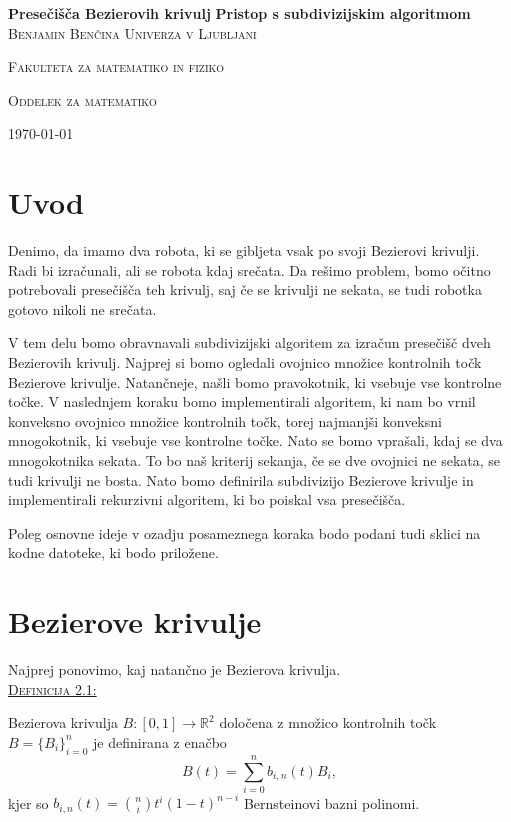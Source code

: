 \documentclass[a4paper, 12pt]{article} %
\newenvironment{matematika}[1]{
{\underline{\textsc{#1:}}}
}{
}
\begin{document}
\begin{titlepage}
\centering
\textbf{\Huge{Presečišča Bezierovih krivulj}}
\vfill
\textbf{\LARGE{Pristop s subdivizijskim algoritmom}}
\vfill\vfill
\textsc{\Large{Benjamin Benčina}}
\vfill\vfill
\textsc{\large{Univerza v Ljubljani}}

\textsc{\large{Fakulteta za matematiko in fiziko}}

\textsc{\large{Oddelek za matematiko}}
\vfill\vfill\vfill
	
{\large\today}

\end{titlepage}

\tableofcontents
\newpage

\section{Uvod}

Denimo, da imamo dva robota, ki se gibljeta vsak po svoji Bezierovi krivulji. Radi bi izračunali, ali se robota kdaj srečata. Da rešimo problem, bomo očitno potrebovali presečišča teh krivulj, saj če se krivulji ne sekata, se tudi robotka gotovo nikoli ne srečata.

V tem delu bomo obravnavali subdivizijski algoritem za izračun presečišč dveh Bezierovih krivulj. Najprej si bomo ogledali ovojnico množice kontrolnih točk Bezierove krivulje. Natančneje, našli bomo pravokotnik, ki vsebuje vse kontrolne točke. V naslednjem koraku bomo implementirali algoritem, ki nam bo vrnil konveksno ovojnico množice kontrolnih točk, torej najmanjši konveksni mnogokotnik, ki vsebuje vse kontrolne točke. Nato se bomo vprašali, kdaj se dva mnogokotnika sekata. To bo naš kriterij sekanja, če se dve ovojnici ne sekata, se tudi krivulji ne bosta. Nato bomo definirila subdivizijo Bezierove krivulje in implementirali rekurzivni algoritem, ki bo poiskal vsa presečišča.

Poleg osnovne ideje v ozadju posameznega koraka bodo podani tudi sklici na kodne datoteke, ki bodo priložene.

\section{Bezierove krivulje}

Najprej ponovimo, kaj natančno je Bezierova krivulja.\\
\begin{matematika}{Definicija 2.1}
Bezierova krivulja $B\colon [0, 1] \to \mathbb{R}^2$ določena z množico kontrolnih točk $B = \lbrace B_i \rbrace_{i = 0}^n$ je definirana z enačbo
\[ B(t) = \sum_{i = 0}^n b_{i,n}(t)B_i, \]
kjer so $b_{i,n}(t) = \binom{n}{i}t^{i}(1-t)^{n-i}$ Bernsteinovi bazni polinomi.
\end{matematika}
\end{document}
